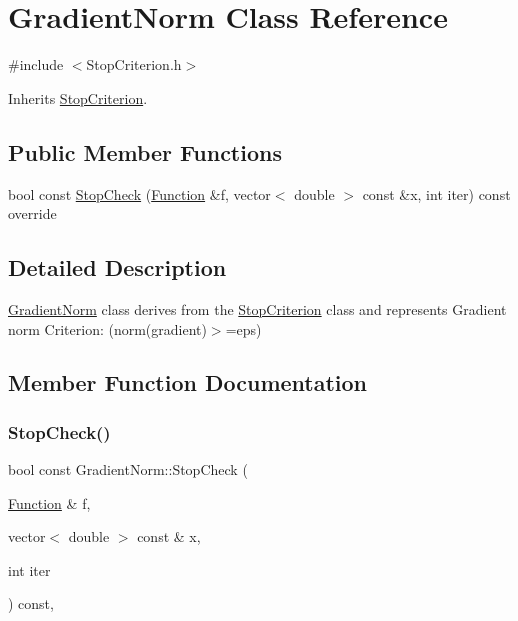 \hypertarget{class_gradient_norm}{}\section{Gradient\+Norm Class Reference}
\label{class_gradient_norm}


{\ttfamily \#include $<$Stop\+Criterion.\+h$>$}



Inherits \hyperlink{class_stop_criterion}{Stop\+Criterion}.

\subsection*{Public Member Functions}
\begin{DoxyCompactItemize}
\item 
bool const \hyperlink{class_gradient_norm_a145df51258f31400dbf26bfd3b34a10b}{Stop\+Check} (\hyperlink{class_function}{Function} \&f, vector$<$ double $>$ const \&x, int iter) const override
\end{DoxyCompactItemize}


\subsection{Detailed Description}
\hyperlink{class_gradient_norm}{Gradient\+Norm} class derives from the \hyperlink{class_stop_criterion}{Stop\+Criterion} class and represents Gradient norm Criterion\+: (norm(gradient)$>$=eps) 

\subsection{Member Function Documentation}
\mbox{\label{class_gradient_norm_a145df51258f31400dbf26bfd3b34a10b}} 
\subsubsection{\texorpdfstring{Stop\+Check()}{StopCheck()}}
{\footnotesize\ttfamily bool const Gradient\+Norm\+::\+Stop\+Check (\begin{DoxyParamCaption}\item[{\hyperlink{class_function}{Function} \&}]{f,  }\item[{vector$<$ double $>$ const \&}]{x,  }\item[{int}]{iter }\end{DoxyParamCaption}) const\hspace{0.3cm}{\ttfamily [override]}, {\ttfamily [virtual]}}

